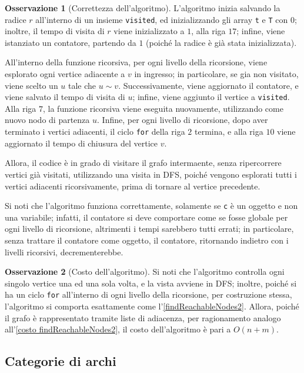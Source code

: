 \documentclass[14pt]{extreport}
\theoremstyle{definition}
\theoremstyle{definition}
\newtheorem{remark}{Osservazione}[subsection]
\begin{document}
\begin{remark}[Correttezza dell'algoritmo]
    L'algoritmo inizia salvando la radice $r$ all'interno di un insieme \texttt{visited}, ed inizializzando gli array \texttt{t} e \texttt{T} con $0$; inoltre, il tempo di visita di $r$ viene inizializzato a $1$, alla riga $17$; infine, viene istanziato un contatore, partendo da $1$ (poiché la radice è già stata inizializzata).

    All'interno della funzione ricorsiva, per ogni livello della ricorsione, viene esplorato ogni vertice adiacente a $v$ in ingresso; in particolare, se gia non visitato, viene scelto un $u$ tale che $u \sim v$. Successivamente, viene aggiornato il contatore, e viene salvato il tempo di visita di $u$; infine, viene aggiunto il vertice a \texttt{visited}. Alla riga $7$, la funzione ricorsiva viene eseguita nuovamente, utilizzando come nuovo nodo di partenza $u$. Infine, per ogni livello di ricorsione, dopo aver terminato i vertici adiacenti, il ciclo \texttt{for} della riga $2$ termina, e alla riga $10$ viene aggiornato il tempo di chiusura del vertice $v$.

    Allora, il codice è in grado di visitare il grafo intermaente, senza ripercorrere vertici già visitati, utilizzando una visita in DFS, poiché vengono esplorati tutti i vertici adiacenti ricorsivamente, prima di tornare al vertice precedente.

    Si noti che l'algoritmo funziona correttamente, solamente se \texttt{c} è un oggetto e non una variabile; infatti, il contatore si deve comportare come se fosse globale per ogni livello di ricorsione, altrimenti i tempi sarebbero tutti errati; in particolare, senza trattare il contatore come oggetto, il contatore, ritornando indietro con i livelli ricorsivi, decrementerebbe.
\end{remark}

\begin{remark}[Costo dell'algoritmo]
    Si noti che l'algoritmo controlla ogni singolo vertice una ed una sola volta, e la vista avviene in DFS; inoltre, poiché si ha un ciclo \texttt{for} all'interno di ogni livello della ricorsione, per costruzione stessa, l'algoritmo si comporta esattamente come l'\cref{findReachableNodes2}. Allora, poiché il grafo è rappresentato tramite liste di adiacenza, per ragionamento analogo all'\cref{costo findReachableNodes2}, il costo dell'algoritmo è pari a $O(n + m)$.
\end{remark}

\subsection{Categorie di archi}
\end{document}
